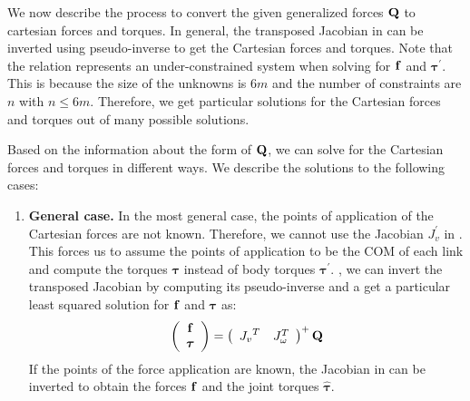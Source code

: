 We now describe the process to convert the given generalized forces $\mathbf{Q}$ to cartesian forces and torques. In general, the transposed Jacobian in  can be inverted using pseudo-inverse to get the Cartesian forces and torques. Note that the relation represents an under-constrained system when solving for $\mathbf{f}$ and $\bm{\tau}^{'}$. This is because the size of the unknowns is $6m$ and the number of constraints are $n$ with $n\le 6m$. Therefore, we get particular solutions for the Cartesian forces and torques out of many possible solutions.

Based on the information about the form of $\mathbf{Q}$, we can solve for the Cartesian forces and torques in different ways. We describe the solutions to the following cases:
\begin{enumerate}
\item \textbf{General case. } In the most general case, the points of application of the Cartesian forces are not known. Therefore, we cannot use the Jacobian $J_{v}^{'}$ in . This forces us to assume the points of application to be the COM of each link and compute the torques $\bm{\tau}$ instead of body torques $\bm{\tau}^{'}$. \ie, we can invert the transposed Jacobian by computing its pseudo-inverse and a get a particular least squared solution for $\mathbf{f}$ and $\bm{\tau}$ as:
\begin{equation}
\left (
\begin{array}{c}
\mathbf{f} \\
\bm{\tau}
\end{array}
\right ) = \left (
\begin{array}{cc}
{J_{v}}^T & {J}_\omega^T
\end{array}
\right )^+ \mathbf{Q}
\end{equation}
If the points of the force application are known, the Jacobian in  can be inverted to obtain the forces $\mathbf{f}$ and the joint torques $\hat{\bm{\tau}}$.


\end{enumerate}
